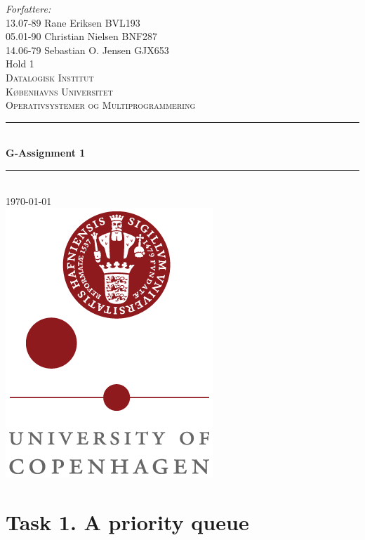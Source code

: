 \documentclass[a4paper,12pt,danish]{report}
\begin{document}
\begin{titlepage}

\newcommand{\HRule}{\rule{\linewidth}{0.4mm}}
\center
\small{ \emph{Forfattere:}\\
13.07-89 Rane Eriksen \textsc{BVL193}
\\
05.01-90 Christian Nielsen \textsc{BNF287}
\\
14.06-79 Sebastian O. Jensen \textsc{GJX653}
\\
Hold 1} \\[2cm]

\textsc{\LARGE Datalogisk Institut}\\[0.5cm]
\textsc{\large Københavns Universitet}\\[1.5cm]
\textsc{\large Operativsystemer og Multiprogrammering}\\
\HRule \\[0.7cm]
{\huge \bfseries G-Assignment 1}\\[0.4cm]
\HRule \\[1.5cm]
\textsc{\Large \textsc{\today}}\\[0.5cm]

\includegraphics[scale=0.5]{ku_logo.png}\\[1cm]

\end{titlepage}
\tableofcontents
\newpage
\renewcommand{\thesection}{\arabic{section}}
\renewcommand{\thempfootnote}{\arabic{mpfootnote}}
\renewcommand\thesubsection{}
\newcommand{\minus}[1]{{#1}^{-}}
\section{Task 1. A priority queue}
\end{document}
